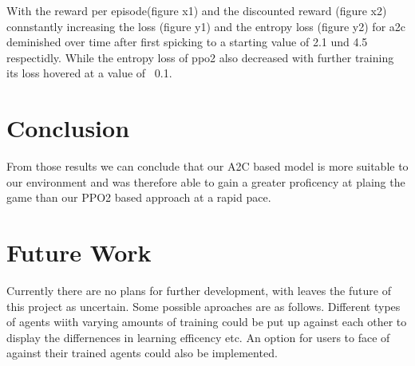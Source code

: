 \documentclass[sigconf]{acmart}
\begin{document}
With the reward per episode(figure x1) and the discounted reward (figure x2) connstantly increasing the loss (figure y1) and the entropy loss (figure y2) for a2c deminished over time after first spicking to a starting value of 2.1 und 4.5 respectidly. While the entropy loss of ppo2 also decreased with further training its loss hovered at a value of ~0.1.



\section{Conclusion}
 From those results we can conclude that our A2C based model is more suitable to our environment and was therefore able to gain a greater proficency at plaing the game than our PPO2 based approach at a rapid pace. 
  
\section{Future Work}
Currently there are no plans for further development, with leaves the future of  this project as uncertain. Some possible aproaches are as follows. 
Different types of agents wiith varying amounts of training could be put up against each other to display the differnences in learning efficency etc. An option for users to face of against their trained agents could also be implemented.
\end{document}
